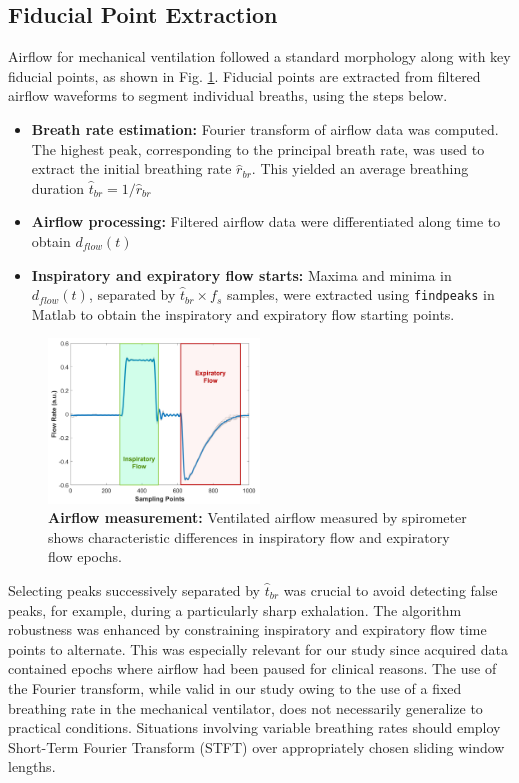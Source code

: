 \documentclass[journal]{IEEEtran}
\begin{document}
\subsection{Fiducial Point Extraction} \label{sec:fiducial}
Airflow for mechanical ventilation followed a standard morphology along with key fiducial points, as shown in Fig. \ref{fig:airflow}. Fiducial points are extracted from filtered airflow waveforms to segment individual breaths, using the steps below. 
\begin{itemize}
    \item \textbf{Breath rate estimation:} Fourier transform of airflow data was computed. The highest peak, corresponding to the principal breath rate, was used to extract the initial breathing rate $\hat{r}_{br}$. This yielded an average breathing duration $\hat{t}_{br} = 1/\hat{r}_{br}$
    \item \textbf{Airflow processing:} Filtered airflow data were differentiated along time to obtain $d_{flow}(t)$ 
    \item \textbf{Inspiratory and expiratory flow starts:} Maxima and minima in $d_{flow}(t)$, separated by $\hat{t}_{br} \times f_{s}$ samples, were extracted using \texttt{findpeaks} in Matlab to obtain the inspiratory and expiratory flow starting points. 
\end{itemize}
\begin{figure}[htpb]
    \centering
    \includegraphics[width=0.5\textwidth]{airflow.jpg}
    \caption{\textbf{Airflow measurement:} Ventilated airflow measured by spirometer shows characteristic differences in inspiratory flow and expiratory flow epochs.}
    \label{fig:airflow}
\end{figure}
Selecting peaks successively separated by $\hat{t}_{br}$ was crucial to avoid detecting false peaks, for example, during a particularly sharp exhalation. The algorithm robustness was enhanced by constraining inspiratory and expiratory flow time points to alternate. This was especially relevant for our study since acquired data contained epochs where airflow had been paused for clinical reasons. The use of the Fourier transform, while valid in our study owing to the use of a fixed breathing rate in the mechanical ventilator, does not necessarily generalize to practical conditions. Situations involving variable breathing rates should employ Short-Term Fourier Transform (STFT) over appropriately chosen sliding window lengths.
\end{document}
